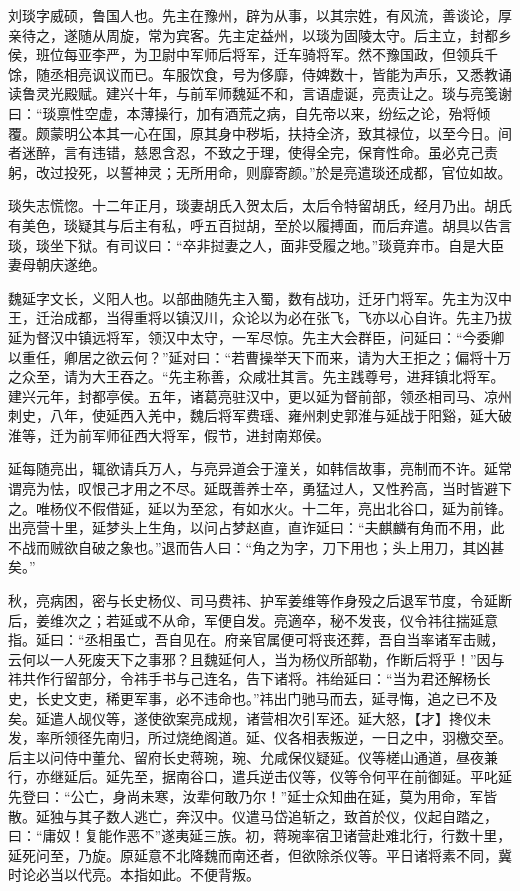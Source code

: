 \documentclass[12pt,UTF8]{ctexbook}
\begin{document}
刘琰字威硕，鲁国人也。先主在豫州，辟为从事，以其宗姓，有风流，善谈论，厚亲待之，遂随从周旋，常为宾客。先主定益州，以琰为固陵太守。后主立，封都乡侯，班位每亚李严，为卫尉中军师后将军，迁车骑将军。然不豫国政，但领兵千馀，随丞相亮讽议而已。车服饮食，号为侈靡，侍婢数十，皆能为声乐，又悉教诵读鲁灵光殿赋。建兴十年，与前军师魏延不和，言语虚诞，亮责让之。琰与亮笺谢曰：“琰禀性空虚，本薄操行，加有酒荒之病，自先帝以来，纷纭之论，殆将倾覆。颇蒙明公本其一心在国，原其身中秽垢，扶持全济，致其禄位，以至今日。间者迷醉，言有违错，慈恩含忍，不致之于理，使得全完，保育性命。虽必克己责躬，改过投死，以誓神灵；无所用命，则靡寄颜。”於是亮遣琰还成都，官位如故。

琰失志慌惚。十二年正月，琰妻胡氏入贺太后，太后令特留胡氏，经月乃出。胡氏有美色，琰疑其与后主有私，呼五百挝胡，至於以履搏面，而后弃遣。胡具以告言琰，琰坐下狱。有司议曰：“卒非挝妻之人，面非受履之地。”琰竟弃市。自是大臣妻母朝庆遂绝。

魏延字文长，义阳人也。以部曲随先主入蜀，数有战功，迁牙门将军。先主为汉中王，迁治成都，当得重将以镇汉川，众论以为必在张飞，飞亦以心自许。先主乃拔延为督汉中镇远将军，领汉中太守，一军尽惊。先主大会群臣，问延曰：“今委卿以重任，卿居之欲云何？”延对曰：“若曹操举天下而来，请为大王拒之；偏将十万之众至，请为大王吞之。“先主称善，众咸壮其言。先主践尊号，进拜镇北将军。建兴元年，封都亭侯。五年，诸葛亮驻汉中，更以延为督前部，领丞相司马、凉州刺史，八年，使延西入羌中，魏后将军费瑶、雍州刺史郭淮与延战于阳谿，延大破淮等，迁为前军师征西大将军，假节，进封南郑侯。

延每随亮出，辄欲请兵万人，与亮异道会于潼关，如韩信故事，亮制而不许。延常谓亮为怯，叹恨己才用之不尽。延既善养士卒，勇猛过人，又性矜高，当时皆避下之。唯杨仪不假借延，延以为至忿，有如水火。十二年，亮出北谷口，延为前锋。出亮营十里，延梦头上生角，以问占梦赵直，直诈延曰：“夫麒麟有角而不用，此不战而贼欲自破之象也。”退而告人曰：“角之为字，刀下用也；头上用刀，其凶甚矣。”

秋，亮病困，密与长史杨仪、司马费祎、护军姜维等作身殁之后退军节度，令延断后，姜维次之；若延或不从命，军便自发。亮適卒，秘不发丧，仪令祎往揣延意指。延曰：“丞相虽亡，吾自见在。府亲官属便可将丧还葬，吾自当率诸军击贼，云何以一人死废天下之事邪？且魏延何人，当为杨仪所部勒，作断后将乎！”因与祎共作行留部分，令祎手书与己连名，告下诸将。祎绐延曰：“当为君还解杨长史，长史文吏，稀更军事，必不违命也。”祎出门驰马而去，延寻悔，追之已不及矣。延遣人觇仪等，遂使欲案亮成规，诸营相次引军还。延大怒，【才】搀仪未发，率所领径先南归，所过烧绝阁道。延、仪各相表叛逆，一日之中，羽檄交至。后主以问侍中董允、留府长史蒋琬，琬、允咸保仪疑延。仪等槎山通道，昼夜兼行，亦继延后。延先至，据南谷口，遣兵逆击仪等，仪等令何平在前御延。平叱延先登曰：“公亡，身尚未寒，汝辈何敢乃尔！”延士众知曲在延，莫为用命，军皆散。延独与其子数人逃亡，奔汉中。仪遣马岱追斩之，致首於仪，仪起自踏之，曰：“庸奴！复能作恶不”遂夷延三族。初，蒋琬率宿卫诸营赴难北行，行数十里，延死问至，乃旋。原延意不北降魏而南还者，但欲除杀仪等。平日诸将素不同，冀时论必当以代亮。本指如此。不便背叛。
\end{document}
